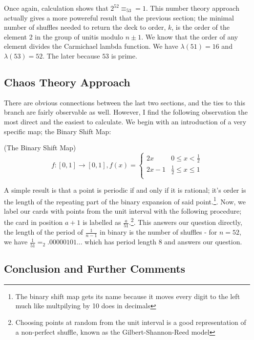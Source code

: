 \documentclass[../../Axiomathic.tex]{subfiles}
\begin{document}
Once again, calculation shows that $2^52 \equiv_{53} =1$. This number theory approach actually gives a more powereful result that the previous section; the minimal number of shuffles needed to return the deck to order, $k$, is the order of the element 2 in the group of unitis modulo $n \pm 1$. We know that the order of any element divides the Carmichael lambda function. We have $\lambda(51)=16$ and $\lambda(53)=52$. The later because $53$ is prime.

\subsection{Chaos Theory Approach}
There are obvious connections between the last two sections, and the ties to this branch are fairly observable as well. However, I find the following observation the most direct and the easiest to calculate. We begin with an introduction of a very specific map; the Binary Shift Map: \begin{defn}(The Binary Shift Map)\label{Binary Shift Map}
\[f : [0,1] \rightarrow [0,1], f(x)=\begin{cases} 
     2x & 0 \leq x < \frac{1}{2}\\
2x-1 & \frac{1}{2} \leq x \leq 1\\
   \end{cases}
\] \end{defn}

A simple result is that a point is periodic if and only if it is rational; it's order is the length of the repeating part of the binary expansion of said point.\footnote{The binary shift map gets its name because it moves every digit to the left much like multpilying by 10 does in decimals}. Now, we label our cards with points from the unit interval with the following procedure; the card in position $a+1$ is labelled as $\frac{a}{51}$.\footnote{Choosing points at random from the unit interval is a good representation of a non-perfect shuffle, known as the Gilbert-Shannon-Reed model}. This answers our question directly, the length of the period of $\frac{1}{n-1}$ in binary is the number of shuffles - for $n=52$, we have $\frac{1}{51} =_{2} .00000101...$ which has period length 8 and answers our question. 

\subsection{Conclusion and Further Comments}
\end{document}
